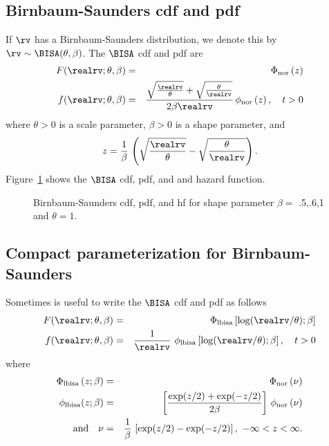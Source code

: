 \subsection{Birnbaum-Saunders cdf and pdf}
\label{section:bisa.pdfcdf}
If $\rv$ has a Birnbaum-Saunders distribution, we denote this by
$\rv \sim \BISA(\theta, \beta)$. The $\BISA$ cdf and pdf are
\begin{eqnarray*}  
 F(\realrv;\theta, \beta)&=&
\Phi_{\rm nor}
\left (z
\right)
\\
 f(\realrv;\theta, \beta)&=&
\frac{
\sqrt{
\frac{\realrv}{\theta}
     }
+
\sqrt{
\frac{\theta}{\realrv}
     }}
     {2 \beta \realrv}
\,
\phi_{\rm nor}
\left (z
\right), \quad t > 0
 \end{eqnarray*} 
where $\theta >0$ is a scale parameter,
$\beta >0$ is a shape parameter, and 
\begin{displaymath}
z=\frac{1}{\beta} \,
\left (
\sqrt{
\frac{\realrv}{\theta}
     }
-
\sqrt{
\frac{\theta}{\realrv}
     }
\right ).
\end{displaymath}
Figure~\ref{figure:distplot.bisa.ps} shows the $\BISA$ cdf, pdf, and
and hazard function.
\begin{figure}
\caption{Birnbaum-Saunders
cdf, pdf, and hf for shape parameter $\beta=$ .5,.6,1
and $\theta=1$.}
\label{figure:distplot.bisa.ps}
\end{figure}
\subsection{Compact parameterization for Birnbaum-Saunders}

Sometimes is useful to write the $\BISA$ cdf and pdf as follows
\begin{eqnarray*}  
 F(\realrv;\theta, \beta)&=&
 \Phi_{\rm lbisa} \left [\log(\realrv/\theta);\beta \right ]
\\
 f(\realrv;\theta, \beta)&=&
\frac{1}{\realrv}
 \,\,
\phi_{\rm lbisa} \left [\log(\realrv/\theta);\beta \right ], \quad t > 0
\end{eqnarray*}
where 
\begin{eqnarray*}
\Phi_{\rm lbisa} \left (z;\beta \right )
&=&
\Phi_{\rm nor}
\left ( \nu
\right)
\\
 \phi_{\rm lbisa}(z; \beta)&=&
 \left [
\frac{
\exp(z/2)
+
\exp(-z/2)
      }
     {2 \beta }
 \right ]
\,
\phi_{\rm nor}
\left (\nu
\right)
\\
\mbox{and} \quad \nu&=&\frac{1}{\beta} \,
\left [
  \exp(z/2)
-
   \exp(-z/2)
\right ],\,\,-\infty< z< \infty.
 \end{eqnarray*} 

